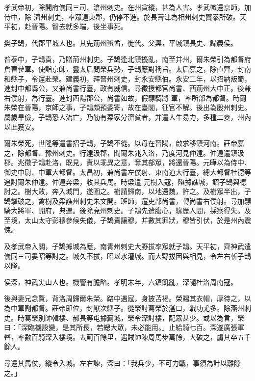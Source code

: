 \begin{pinyinscope}
 孝武帝初，除開府儀同三司、滄州刺史。在州貪縱，甚為人害。孝武徵還京師，加侍中，除
 濟州刺史，率眾達東郡，仍停不進。於長壽津為相州刺史竇泰所破。天平初，赴晉陽。智去就多端，後坐事死。



 樊子鵠，代郡平城人也。其先荊州蠻酋，徙代。父興，平城鎮長史、歸義侯。



 普泰中，子鵠貴，乃贈荊州刺史。子鵠逢北鎮擾亂，南至并州，爾朱榮引為都督府倉曹參軍。使詣京師，靈太后問榮兵勢，子鵠應對稱旨。太后嘉之，除直齊，封南和縣子，令還赴榮。建義初，拜晉州刺史，封永安縣伯。永安二年，以招納叛蜀，進封中都縣公，又兼尚書行臺，政有威信。尋徵授都官尚書、西荊州大中正。後兼右僕射，為行臺。進封西陽郡公，尚書如故，假驃騎將
 軍，率所部為都督。時爾朱榮在晉陽，京師之事，子鵠頗預委寄，故在臺閣，征官不解。後出為殷州刺史。屬歲旱儉，子鵠恐人流亡，乃勒有粟家分濟貧者，并遣人牛易力，多種二麥，州內以此獲安。



 爾朱榮死，世隆等遣書招子鵠，子鵠不從。以母在晉陽，啟求移鎮河南。莊帝嘉之，除都督、豫州刺史。行達汲郡，聞爾朱兆入洛，乃度河見仲遠。仲遠遣鎮汲郡。兆徵子鵠赴洛，既見，責以乖異之意，奪其部眾，將還晉陽。元曄以為侍中、御史中尉、中軍大都督。太昌初，兼尚書左僕射、東南道大行臺，總大都督杜德等追討爾朱仲遠。仲遠奔梁，收其兵馬。時梁遣
 元樹入寇，陷據譙城，詔子鵠與德討之。樹大敗，奔入城門，遂圍之。樹請歸南，以地還魏，許之。及樹眾半出，子鵠擊破之，禽樹及梁譙州刺史朱文開。班師，遷吏部尚書，轉尚書右僕射。尋加驃騎大將軍、開府，典選。後除兗州刺史。子鵠先遣腹心，緣歷人間，採察得失。及至境，太山太守彭穆參候失儀，子鵠責讓穆，并數其罪狀，穆皆引伏，於是州內震悚。



 及孝武帝入關，子鵠據城為應，南青州刺史大野拔率眾就子鵠。天平初，齊神武遣儀同三司婁昭等討之。城久不拔，昭以水灌城。而大野拔因與相見，令左右斬子鵠以降。



 侯深，神武尖山人也。機警有膽略。孝明末年，六鎮飢亂，深隨杜洛周南寇。



 後與妻兄念賢，背洛周歸爾朱榮。路中遇寇，身披苫褐。榮賜其衣帽，厚待之，以為中軍副都督。莊帝即位，封厭次縣子。從榮討葛榮於滏口，戰功尤多。除燕州刺史。時葛榮別帥韓樓、郝長等屯據薊城，榮令深討樓，配眾甚少。或以為言，榮曰：「深臨機設變，是其所長，若總大眾，未必能用。」止給騎七百。深遂廣張軍聲，率數百騎深入樓境。去薊百餘里，遇賊帥陳周馬步萬餘，大破之，虜其卒五千餘人。



 尋還其馬仗，縱令入城。左右諫，深曰：「我兵少，不可力戰，事須為計以離隙之。」




\end{pinyinscope}
